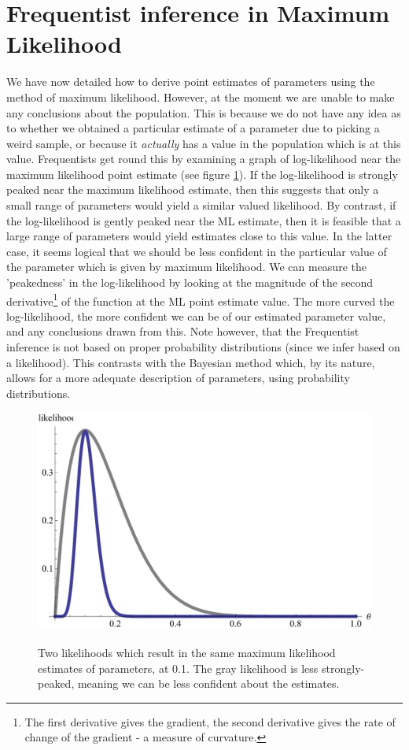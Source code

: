 \documentclass[11pt,fullpage]{book}
\begin{document}
\section{Frequentist inference in Maximum Likelihood}
We have now detailed how to derive point estimates of parameters using the method of maximum likelihood. However, at the moment we are unable to make any conclusions about the population. This is because we do not have any idea as to whether we obtained a particular estimate of a parameter due to picking a weird sample, or because it \textit{actually} has a value in the population which is at this value. Frequentists get round this by examining a graph of log-likelihood near the maximum likelihood point estimate (see figure \ref{fig:Likelihood_likelihoodCurvature}). If the log-likelihood is strongly peaked near the maximum likelihood estimate, then this suggests that only a small range of parameters would yield a similar valued likelihood. By contrast, if the log-likelihood is gently peaked near the ML estimate, then it is feasible that a large range of parameters would yield estimates close to this value. In the latter case, it seems logical that we should be less confident in the particular value of the parameter which is given by maximum likelihood. We can measure the 'peakedness' in the log-likelihood by looking at the magnitude of the second derivative\footnote{The first derivative gives the gradient, the second derivative gives the rate of change of the gradient - a measure of curvature.} of the function at the ML point estimate value. The more curved the log-likelihood, the more confident we can be of our estimated parameter value, and any conclusions drawn from this. Note however, that the Frequentist inference is not based on proper probability distributions (since we infer based on a likelihood). This contrasts with the Bayesian method which, by its nature, allows for a more adequate description of parameters, using probability distributions.

\begin{figure}
\centering
\scalebox{0.65} 
{\includegraphics{Likelihood_likelihoodCurvature.pdf}}
\caption{Two likelihoods which result in the same maximum likelihood estimates of parameters, at 0.1. The gray likelihood is less strongly-peaked, meaning we can be less confident about the estimates.}\label{fig:Likelihood_likelihoodCurvature}
\end{figure}
\end{document}
